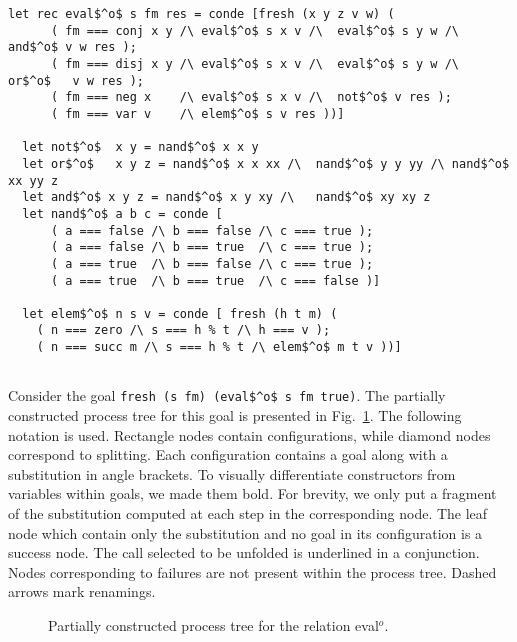 \begin{figure*}[!t]
  \centering
  \begin{minipage}{0.95\textwidth}
    \begin{lstlisting}[label={eval:whole}, caption={Evaluator of propositional formulas}, captionpos=b, frame=tb]
  let rec eval$^o$ s fm res = conde [fresh (x y z v w) (
      ( fm === conj x y /\ eval$^o$ s x v /\  eval$^o$ s y w /\  and$^o$ v w res );
      ( fm === disj x y /\ eval$^o$ s x v /\  eval$^o$ s y w /\  or$^o$   v w res );
      ( fm === neg x    /\ eval$^o$ s x v /\  not$^o$ v res );
      ( fm === var v    /\ elem$^o$ s v res ))]

  let not$^o$  x y = nand$^o$ x x y
  let or$^o$   x y z = nand$^o$ x x xx /\  nand$^o$ y y yy /\ nand$^o$ xx yy z
  let and$^o$ x y z = nand$^o$ x y xy /\   nand$^o$ xy xy z
  let nand$^o$ a b c = conde [
      ( a === false /\ b === false /\ c === true );
      ( a === false /\ b === true  /\ c === true );
      ( a === true  /\ b === false /\ c === true );
      ( a === true  /\ b === true  /\ c === false )]

  let elem$^o$ n s v = conde [ fresh (h t m) (
    ( n === zero /\ s === h % t /\ h === v );
    ( n === succ m /\ s === h % t /\ elem$^o$ m t v ))]


    \end{lstlisting}
  \end{minipage}
\end{figure*}

Consider the goal \lstinline{fresh (s fm) (eval$^o$ s fm true)}.
The partially constructed process tree for this goal is presented in Fig.~\ref{fig:evalTree}.
The following notation is used.
Rectangle nodes contain configurations, while diamond nodes correspond to splitting.
Each configuration contains a goal along with a substitution in angle brackets.
To visually differentiate constructors from variables within goals, we made them bold.
For brevity, we only put a fragment of the substitution computed at each step in the corresponding node.
The leaf node which contain only the substitution and no goal in its configuration is a success node.
The call selected to be unfolded is underlined in a conjunction.
Nodes corresponding to failures are not present within the process tree.
Dashed arrows mark renamings.

\begin{figure}[!t]
  \centering
  \begin{minipage}{0.95\textwidth}
    
  \end{minipage}
  \caption{Partially constructed process tree for the relation eval$^o$.}
  \label{fig:evalTree}
\end{figure}


